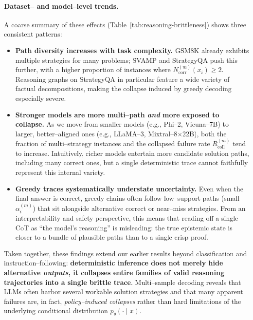 \paragraph{Dataset-- and model--level trends.}
A coarse summary of these effects (Table~\ref{tab:reasoning-brittleness})
shows three consistent patterns:

\begin{itemize}[leftmargin=1.5em]
  \item \textbf{Path diversity increases with task complexity.}
  GSM8K already exhibits multiple strategies for many problems; SVAMP
  and StrategyQA push this further, with a higher proportion of
  instances where $N_{\text{corr}}^{(m)}(x_i) \ge 2$.
  Reasoning graphs on StrategyQA in particular feature a wide variety
  of factual decompositions, making the collapse induced by greedy
  decoding especially severe.

  \item \textbf{Stronger models are more multi--path \emph{and} more exposed to collapse.}
  As we move from smaller models (e.g., Phi--2, Vicuna--7B) to larger,
  better--aligned ones (e.g., LLaMA--3, Mixtral--8$\times$22B), both
  the fraction of multi--strategy instances and the collapsed failure
  rate $R_{\mathrm{coll}}^{(m)}$ tend to increase.
  Intuitively, richer models entertain more candidate solution paths,
  including many correct ones, but a single deterministic trace
  cannot faithfully represent this internal variety.

  \item \textbf{Greedy traces systematically understate uncertainty.}
  Even when the final answer is correct, greedy chains often follow
  low--support paths (small $\alpha_i^{(m)}$) that sit alongside
  alternative correct or near--miss strategies.
  From an interpretability and safety perspective, this means that
  reading off a single CoT as ``the model’s reasoning'' is misleading:
  the true epistemic state is closer to a bundle of plausible paths
  than to a single crisp proof.
\end{itemize}

Taken together, these findings extend our earlier results beyond
classification and instruction--following:
\textbf{deterministic inference does not merely hide alternative
\emph{outputs}, it collapses entire families of valid reasoning
trajectories into a single brittle trace}.
Multi--sample decoding reveals that LLMs often harbor several workable
solution strategies and that many apparent failures are, in fact,
\emph{policy--induced collapses} rather than hard limitations of the
underlying conditional distribution $p_\theta(\cdot \mid x)$.

